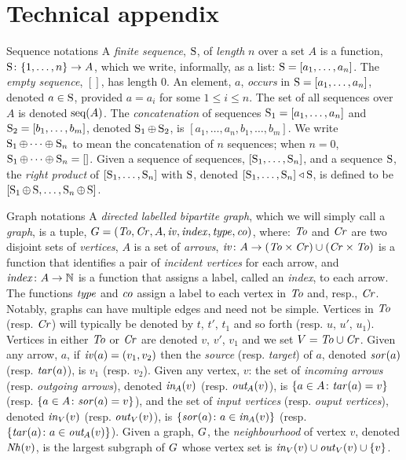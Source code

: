 \documentclass[a4paper]{article}
\theoremstyle{definition}
\begin{document}
	\section{Technical appendix} \label{appendix}
	\begin{paragraph}{Sequence notations}
		A \textit{finite sequence}, $\operatorname{S}$, of \textit{length} $n$ over a set $A$ is a function, $\operatorname{S}\colon \{1,\ldots,n\}\to A$, which we write, informally, as a list: $\operatorname{S}=[a_1,\ldots,a_n]$. The \textit{empty sequence}, $[]$, has length 0. An element, $a$, \textit{occurs} in $\operatorname{S}=[a_1,\ldots,a_n]$, denoted $a\in \operatorname{S}$,  provided $a=a_i$ for some $1\leq i \leq n$. The set of all sequences over $A$ is denoted $\textup{seq}(A)$. The \textit{concatenation} of sequences $\operatorname{S}_1=[a_1,\ldots,a_n]$ and $\operatorname{S}_2=[b_1,\ldots,b_m]$, denoted $\operatorname{S}_1\oplus \operatorname{S}_2$, is $[a_1,\ldots,a_n,b_1,\ldots,b_m]$. We write $\operatorname{S}_1\oplus \cdots\oplus \operatorname{S}_n$ to mean the concatenation of $n$ sequences; when $n=0$, $\operatorname{S}_1\oplus \cdots\oplus \operatorname{S}_n=[]$. Given a sequence of sequences, $[\operatorname{S}_1,\ldots,\operatorname{S}_n]$, and a sequence $\operatorname{S}$, the \textit{right product} of $[\operatorname{S}_1,\ldots,\operatorname{S}_n]$ with $\operatorname{S}$,  denoted $[\operatorname{S}_1,\ldots,\operatorname{S}_n]\triangleleft \operatorname{S}$, is defined to be $[\operatorname{S}_1\oplus \operatorname{S},\ldots,\operatorname{S}_n\oplus \operatorname{S}]$.
	\end{paragraph}


	\begin{paragraph}{Graph notations}
		A \textit{directed labelled bipartite graph}, which we will simply call a \textit{graph}, is a tuple, $G=(\mathit{To},\mathit{Cr},A,\mathit{iv}, \mathit{index},\mathit{type},\mathit{co})$, where: $\mathit{To}$ and $\mathit{Cr}$ are two disjoint sets of \textit{vertices}, $A$ is a set of \textit{arrows}, $\mathit{iv}\colon A \to (\mathit{To}\times \mathit{Cr}) \cup (\mathit{Cr} \times \mathit{To})$ is a function that identifies a pair of \textit{incident vertices} for each arrow, and $\mathit{index}\colon A \to \mathbb{N}$ is a function that assigns a label, called an \textit{index}, to each arrow. The functions $\mathit{type}$ and $\mathit{co}$ assign a label to each vertex in $\mathit{To}$ and, resp., $\mathit{Cr}$. Notably, graphs can have multiple edges and need not be simple. Vertices in $\mathit{To}$ (resp. $\mathit{Cr}$) will typically be denoted by $t$, $t'$, $t_1$ and so forth (resp. $u$, $u'$, $u_1$). Vertices in either $\mathit{To}$ or $\mathit{Cr}$ are denoted $v$, $v'$, $v_1$ and we set $V=\mathit{To}\cup \mathit{Cr}$.  Given any arrow, $a$, if $\mathit{iv}(a)=(v_1,v_2)$ then the \textit{source} (resp. \textit{target}) of $a$, denoted $\mathit{sor}(a)$ (resp. $\mathit{tar}(a)$), is $v_1$ (resp. $v_2$). Given any vertex, $v$: the set of \textit{incoming arrows} (resp. \textit{outgoing arrows}), denoted $\mathit{in}_{\hspace{-0.084em}A}(v)$ (resp. $\mathit{out}_{\hspace{-0.084em}A}(v)$), is $\{a\in A \colon  \mathit{tar}(a) =v\}$ (resp. $\{a\in A \colon \mathit{sor}(a) =v\}$), and the set of \textit{input vertices} (resp. \textit{ouput vertices}), denoted $\mathit{in}_{\hspace{-0.02em}V}(v)$ (resp. $\mathit{out}_{\hspace{-0.02em}V}(v)$),  is $\{\mathit{sor}(a)\colon a\in \mathit{in}_{\hspace{-0.084em}A}(v)\}$ (resp. $\{\mathit{tar}(a)\colon a\in \mathit{out}_{\hspace{-0.084em}A}(v)\}$). Given a graph, $G$, the \textit{neighbourhood} of vertex $v$, denoted  $\mathit{Nh}(v)$, is the largest subgraph of $G$ whose vertex set is $\mathit{in}_{\hspace{-0.02em}V}(v)\cup \mathit{out}_{\hspace{-0.02em}V}(v)\cup \{v\}$.
	\end{paragraph}
\end{document}
